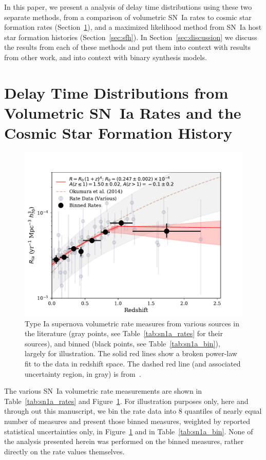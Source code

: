 \documentclass[apj]{aastex62}
\begin{document}
In this paper, we present a analysis of delay time distributions using these two separate methods, from a comparison of volumetric SN~Ia rates to cosmic star formation rates (Section~\ref{sec:rates}), and a maximized likelihood method from SN~Ia host star formation histories (Section~\ref{sec:sfh}). In Section~\ref{sec:discussion} we discuss the results from each of these methods and put them into context with results from other work, and into context with binary synthesis models.

\section{Delay Time Distributions from Volumetric SN~Ia Rates and the Cosmic Star Formation History}\label{sec:rates}

\begin{figure}[t]
   \centering
   \includegraphics[width=6.1in]{figure_SNIa_rate_z_pwr_fit}
   \caption{\footnotesize Type Ia supernova volumetric rate measures from various sources in the literature (gray points, see Table~\ref{tab:sn1a_rates} for their sources), and binned (black points, see Table~\ref{tab:sn1a_bin}), largely for illustration. The solid red lines show a broken power-law fit to the data in redshift space. The dashed red line (and associated uncertainty region, in gray) is from~\cite{Okumura:2014}.}
   \label{fig:sn1a_rates}
\end{figure}

The various SN~Ia volumetric rate measurements are shown in Table~\ref{tab:sn1a_rates} and Figure~\ref{fig:sn1a_rates}. For illustration purposes only, here and through out this manuscript, we bin the rate data into 8 quantiles of nearly equal number of measures and present those binned measures, weighted by reported statistical uncertainties only, in Figure~\ref{fig:sn1a_rates} and in Table~\ref{tab:sn1a_bin}. None of the analysis presented herein was performed on the binned measures, rather directly on the rate values themselves.
\end{document}
